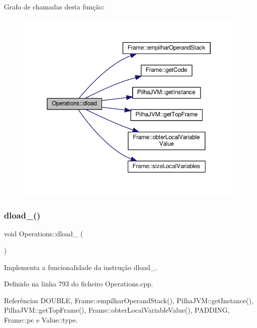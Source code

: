 Grafo de chamadas desta função\+:
\nopagebreak
\begin{figure}[H]
\begin{center}
\leavevmode
\includegraphics[width=350pt]{classOperations_af53b0b32da7737741c20b4e313eaac84_cgraph}
\end{center}
\end{figure}
\mbox{\label{classOperations_a176a81199439e0b22d206c72ea4a1fba}} 
\subsubsection{\texorpdfstring{dload\+\_()}{dload\_0()}}
{\footnotesize\ttfamily void Operations\+::dload\+\_ (\begin{DoxyParamCaption}{ }\end{DoxyParamCaption})\hspace{0.3cm}{\ttfamily [private]}}



Implementa a funcionalidade da instrução dload\+\_. 



Definido na linha 793 do ficheiro Operations.\+cpp.



Referências D\+O\+U\+B\+LE, Frame\+::empilhar\+Operand\+Stack(), Pilha\+J\+V\+M\+::get\+Instance(), Pilha\+J\+V\+M\+::get\+Top\+Frame(), Frame\+::obter\+Local\+Variable\+Value(), P\+A\+D\+D\+I\+NG, Frame\+::pc e Value\+::type.



